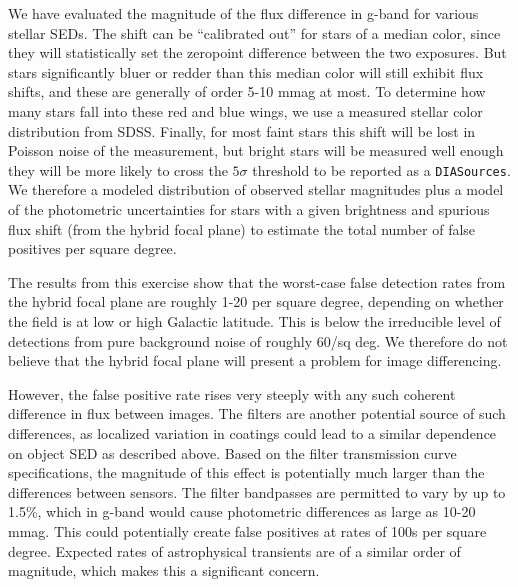 \documentclass[12pt]{article}
\newcommand{\code}[1]{\texttt{#1}}
\newcommand{\DIASources}{\code{DIASources}\xspace}
\begin{document}
We have evaluated the magnitude of the flux difference in g-band for various
stellar SEDs. The shift can be ``calibrated out'' for stars of a median color,
since they will statistically set the zeropoint difference between the two
exposures. But stars significantly bluer or redder than this median color will
still exhibit flux shifts, and these are generally of order 5-10 mmag at most.
To determine how many stars fall into these red and blue wings, we use a
measured stellar color distribution from SDSS. Finally, for most faint stars
this shift will be lost in Poisson noise of the measurement, but bright stars
will be measured well enough they will be more likely to cross the $5\sigma$
threshold to be reported as a \DIASources. We therefore a modeled distribution
of observed stellar magnitudes plus a model of the photometric uncertainties for
stars with a given brightness and spurious flux shift (from the hybrid focal
plane) to estimate the total number of false positives per square degree.

The results from this exercise show that the worst-case false detection rates
from the hybrid focal plane are roughly 1-20 per square degree, depending on
whether the field is at low or high Galactic latitude. This is below the
irreducible level of detections from pure background noise of roughly 60/sq deg.
We therefore do not believe that the hybrid focal plane will present a problem
for image differencing.

However, the false positive rate rises very steeply with any such coherent
difference in flux between images. The filters are another potential source of
such differences, as localized variation in coatings could lead to a similar
dependence on object SED as described above. Based on the filter transmission
curve specifications, the magnitude of this effect is potentially much larger
than the differences between sensors. The filter bandpasses are permitted to
vary by up to 1.5\%, which in g-band would cause photometric differences as
large as 10-20 mmag. This could potentially create false positives at rates of
100s per square degree. Expected rates of astrophysical transients are of a
similar order of magnitude, which makes this a significant concern.
\end{document}
